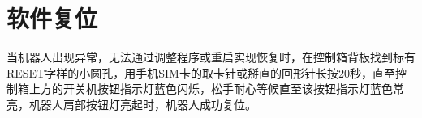 \chapter{软件复位}

当机器人出现异常，无法通过调整程序或重启实现恢复时，在控制箱背板找到标有{\sf RESET}字样的小圆孔，用手机SIM卡的取卡针或掰直的回形针长按20秒，直至控制箱上方的开关机按钮指示灯蓝色闪烁，松手耐心等候直至该按钮指示灯蓝色常亮，机器人肩部按钮灯亮起时，机器人成功复位。

